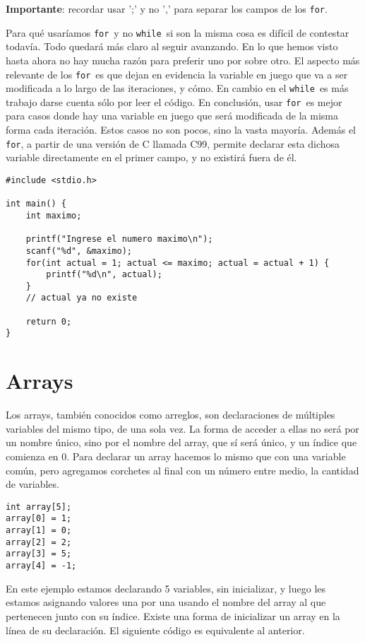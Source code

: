 \documentclass[10pt]{article}
\newcommand{\cwhile}[0]{\lstinline{while}}
\newcommand{\cfor}[0]{\lstinline{for}}
\begin{document}
\bigskip

\textbf{Importante}: recordar usar ';' y no ',' para separar los campos de los \cfor.

\bigskip

Para qué usaríamos \cfor\ y no \cwhile\ si son la misma cosa es difícil de contestar todavía. Todo quedará más claro al seguir avanzando. En lo que hemos visto hasta ahora no hay mucha razón para preferir uno por sobre otro. El aspecto más relevante de los \cfor\ es que dejan en evidencia la variable en juego que va a ser modificada a lo largo de las iteraciones, y cómo. En cambio en el \cwhile\ es más trabajo darse cuenta sólo por leer el código. En conclusión, usar \cfor\ es mejor para casos donde hay una variable en juego que será modificada de la misma forma cada iteración. Estos casos no son pocos, sino la vasta mayoría. Además el \cfor, a partir de una versión de C llamada C99, permite declarar esta dichosa variable directamente en el primer campo, y no existirá fuera de él.

\begin{lstlisting}
#include <stdio.h>

int main() {
	int maximo;

	printf("Ingrese el numero maximo\n");
	scanf("%d", &maximo);
	for(int actual = 1; actual <= maximo; actual = actual + 1) {
		printf("%d\n", actual);
	}
	// actual ya no existe

	return 0;
}
\end{lstlisting}

\section{Arrays}

Los arrays, también conocidos como arreglos, son declaraciones de múltiples variables del mismo tipo, de una sola vez. La forma de acceder a ellas no será por un nombre único, sino por el nombre del array, que sí será único, y un índice que comienza en 0. Para declarar un array hacemos lo mismo que con una variable común, pero agregamos corchetes al final con un número entre medio, la cantidad de variables.

\begin{lstlisting}
int array[5];
array[0] = 1;
array[1] = 0;
array[2] = 2;
array[3] = 5;
array[4] = -1;
\end{lstlisting}

En este ejemplo estamos declarando 5 variables, sin inicializar, y luego les estamos asignando valores una por una usando el nombre del array al que pertenecen junto con su índice. Existe una forma de inicializar un array en la línea de su declaración. El siguiente código es equivalente al anterior.
\end{document}
